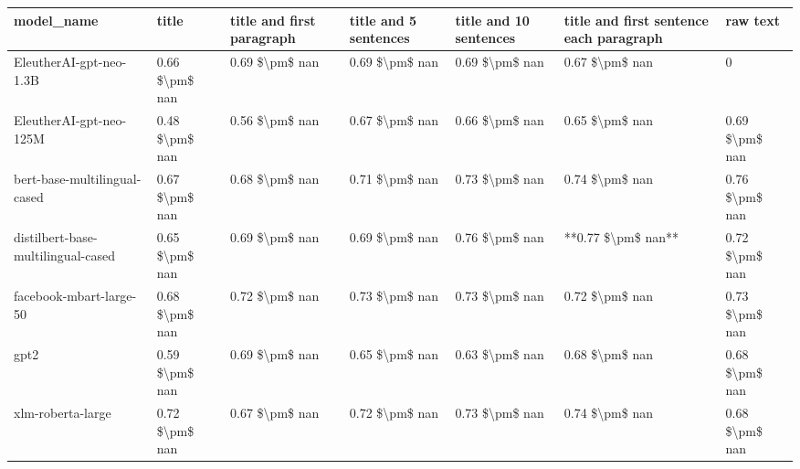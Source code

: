 \begin{tabular}{lllllll}
\toprule
                        model\_name &          title & title and first paragraph & title and 5 sentences & title and 10 sentences & title and first sentence each paragraph &       raw text \\
\midrule
           EleutherAI-gpt-neo-1.3B & 0.66 \$\textbackslash pm\$ nan &            0.69 \$\textbackslash pm\$ nan &        0.69 \$\textbackslash pm\$ nan &         0.69 \$\textbackslash pm\$ nan &                          0.67 \$\textbackslash pm\$ nan &              0 \\
           EleutherAI-gpt-neo-125M & 0.48 \$\textbackslash pm\$ nan &            0.56 \$\textbackslash pm\$ nan &        0.67 \$\textbackslash pm\$ nan &         0.66 \$\textbackslash pm\$ nan &                          0.65 \$\textbackslash pm\$ nan & 0.69 \$\textbackslash pm\$ nan \\
      bert-base-multilingual-cased & 0.67 \$\textbackslash pm\$ nan &            0.68 \$\textbackslash pm\$ nan &        0.71 \$\textbackslash pm\$ nan &         0.73 \$\textbackslash pm\$ nan &                          0.74 \$\textbackslash pm\$ nan & 0.76 \$\textbackslash pm\$ nan \\
distilbert-base-multilingual-cased & 0.65 \$\textbackslash pm\$ nan &            0.69 \$\textbackslash pm\$ nan &        0.69 \$\textbackslash pm\$ nan &         0.76 \$\textbackslash pm\$ nan &                      **0.77 \$\textbackslash pm\$ nan** & 0.72 \$\textbackslash pm\$ nan \\
           facebook-mbart-large-50 & 0.68 \$\textbackslash pm\$ nan &            0.72 \$\textbackslash pm\$ nan &        0.73 \$\textbackslash pm\$ nan &         0.73 \$\textbackslash pm\$ nan &                          0.72 \$\textbackslash pm\$ nan & 0.73 \$\textbackslash pm\$ nan \\
                              gpt2 & 0.59 \$\textbackslash pm\$ nan &            0.69 \$\textbackslash pm\$ nan &        0.65 \$\textbackslash pm\$ nan &         0.63 \$\textbackslash pm\$ nan &                          0.68 \$\textbackslash pm\$ nan & 0.68 \$\textbackslash pm\$ nan \\
                 xlm-roberta-large & 0.72 \$\textbackslash pm\$ nan &            0.67 \$\textbackslash pm\$ nan &        0.72 \$\textbackslash pm\$ nan &         0.73 \$\textbackslash pm\$ nan &                          0.74 \$\textbackslash pm\$ nan & 0.68 \$\textbackslash pm\$ nan \\
\bottomrule
\end{tabular}
